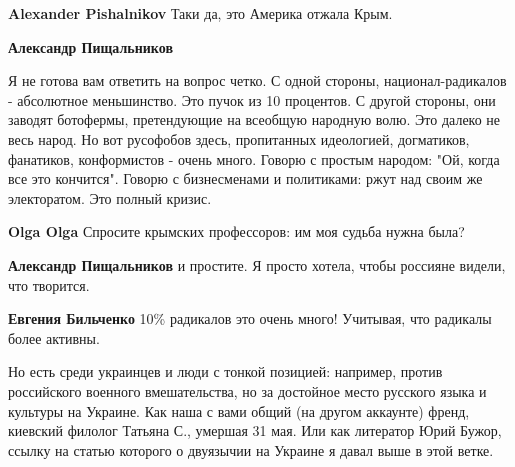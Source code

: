 \begin{itemize}
\begin{itemize}
\textbf{Alexander Pishalnikov} Таки да, это Америка отжала Крым.🤣

 
\textbf{Александр Пищальников} 

Я не готова вам ответить на вопрос четко. С одной стороны, национал-радикалов -
абсолютное меньшинство. Это пучок из 10 процентов. С другой стороны, они
заводят ботофермы, претендующие на всеобщую народную волю. Это далеко не весь
народ. Но вот русофобов здесь, пропитанных идеологией, догматиков, фанатиков,
конформистов - очень много. Говорю с простым народом: "Ой, когда все это
кончится". Говорю с бизнесменами и политиками: ржут над своим же электоратом.
Это полный кризис.

 
\textbf{Olga Olga} Спросите крымских профессоров: им моя судьба нужна была?

 
\textbf{Александр Пищальников} и простите. Я просто хотела, чтобы россияне видели, что творится.

 
\textbf{Евгения Бильченко} 10\% радикалов это очень много! Учитывая, что радикалы более активны.

Но есть среди украинцев и люди с тонкой позицией: например, против российского
военного вмешательства, но за достойное место русского языка и культуры на
Украине. Как наша с вами общий (на другом аккаунте) френд, киевский филолог
Татьяна С., умершая 31 мая. Или как литератор Юрий Бужор, ссылку на статью
которого о двуязычии на Украине я давал выше в этой ветке.


\end{itemize}
\end{itemize}
